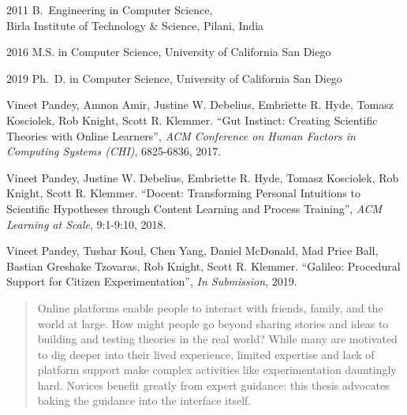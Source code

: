 \begin{frontmatter}
%
%
\begin{vitapage}
\begin{vita}
  \item[2011] B.~Engineering in Computer Science, \\Birla Institute of Technology \& Science, Pilani, India
  \item[2016] M.S. in Computer Science, University of California San Diego
  \item[2019] Ph.~D. in Computer Science, University of California San Diego
\end{vita}
\begin{publications}
 \item Vineet Pandey, Amnon Amir, Justine W. Debelius, Embriette R. Hyde, Tomasz Kosciolek, Rob Knight, Scott R. Klemmer. ``Gut Instinct: Creating Scientific Theories
with Online Learners'', \emph{ACM Conference on Human Factors in Computing Systems (CHI)}, 6825-6836, 2017.
\item Vineet Pandey, Justine W. Debelius, Embriette R. Hyde, Tomasz Kosciolek, Rob Knight, Scott R. Klemmer. ``Docent: Transforming Personal Intuitions to Scientific Hypotheses
through Content Learning and Process Training'', \emph{ACM Learning at Scale}, 9:1-9:10,  2018.
\item Vineet Pandey, Tushar Koul, Chen Yang, Daniel McDonald, Mad Price Ball, Bastian Greshake Tzovaras, Rob Knight, Scott R. Klemmer. ``Galileo: Procedural Support for Citizen Experimentation'', \emph{In Submission},  2019.

\end{publications}
\end{vitapage}


%
%
\begin{abstract}
Online platforms enable people to interact with friends, family, and the world at large. How might people go beyond sharing stories and ideas to building and testing theories in the real world? While many are motivated to dig deeper into their lived experience, limited expertise and lack of platform support make complex activities like experimentation dauntingly hard. Novices benefit greatly from expert guidance: this thesis advocates baking the guidance into the interface itself.


\end{abstract}
\end{frontmatter}
